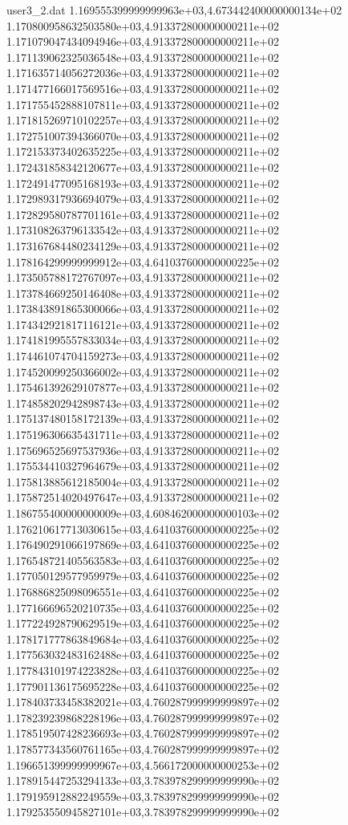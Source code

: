 \begin{filecontents}{user3_2.dat}
1.169555399999999963e+03,4.673442400000000134e+02
1.170800958632503580e+03,4.913372800000000211e+02
1.171079047434094946e+03,4.913372800000000211e+02
1.171139062325036548e+03,4.913372800000000211e+02
1.171635714056272036e+03,4.913372800000000211e+02
1.171477166017569516e+03,4.913372800000000211e+02
1.171755452888107811e+03,4.913372800000000211e+02
1.171815269710102257e+03,4.913372800000000211e+02
1.172751007394366070e+03,4.913372800000000211e+02
1.172153373402635225e+03,4.913372800000000211e+02
1.172431858342120677e+03,4.913372800000000211e+02
1.172491477095168193e+03,4.913372800000000211e+02
1.172989317936694079e+03,4.913372800000000211e+02
1.172829580787701161e+03,4.913372800000000211e+02
1.173108263796133542e+03,4.913372800000000211e+02
1.173167684480234129e+03,4.913372800000000211e+02
1.178164299999999912e+03,4.641037600000000225e+02
1.173505788172767097e+03,4.913372800000000211e+02
1.173784669250146408e+03,4.913372800000000211e+02
1.173843891865300066e+03,4.913372800000000211e+02
1.174342921817116121e+03,4.913372800000000211e+02
1.174181995557833034e+03,4.913372800000000211e+02
1.174461074704159273e+03,4.913372800000000211e+02
1.174520099250366002e+03,4.913372800000000211e+02
1.175461392629107877e+03,4.913372800000000211e+02
1.174858202942898743e+03,4.913372800000000211e+02
1.175137480158172139e+03,4.913372800000000211e+02
1.175196306635431711e+03,4.913372800000000211e+02
1.175696525697537936e+03,4.913372800000000211e+02
1.175534410327964679e+03,4.913372800000000211e+02
1.175813885612185004e+03,4.913372800000000211e+02
1.175872514020497647e+03,4.913372800000000211e+02
1.186755400000000009e+03,4.608462000000000103e+02
1.176210617713030615e+03,4.641037600000000225e+02
1.176490291066197869e+03,4.641037600000000225e+02
1.176548721405563583e+03,4.641037600000000225e+02
1.177050129577959979e+03,4.641037600000000225e+02
1.176886825098096551e+03,4.641037600000000225e+02
1.177166696520210735e+03,4.641037600000000225e+02
1.177224928790629519e+03,4.641037600000000225e+02
1.178171777863849684e+03,4.641037600000000225e+02
1.177563032483162488e+03,4.641037600000000225e+02
1.177843101974223828e+03,4.641037600000000225e+02
1.177901136175695228e+03,4.641037600000000225e+02
1.178403733458382021e+03,4.760287999999999897e+02
1.178239239868228196e+03,4.760287999999999897e+02
1.178519507428236693e+03,4.760287999999999897e+02
1.178577343560761165e+03,4.760287999999999897e+02
1.196651399999999967e+03,4.566172000000000253e+02
1.178915447253294133e+03,3.783978299999999990e+02
1.179195912882249559e+03,3.783978299999999990e+02
1.179253550945827101e+03,3.783978299999999990e+02

\end{filecontents}
